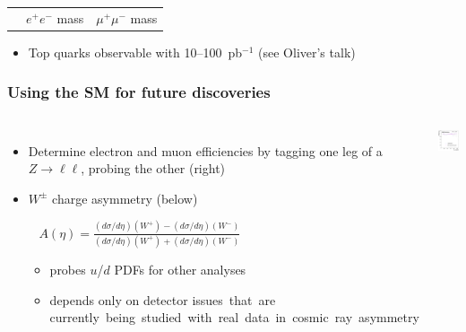 \documentclass[compress]{beamer}
\begin{document}
\begin{frame}
\begin{tabular}{c c c}
& {\scriptsize $e^+e^-$ mass} & {\scriptsize $\mu^+\mu^-$ mass} \\
\end{tabular}

\begin{itemize}
\item Top quarks observable with 10--100~pb$^{-1}$ (see Oliver's talk)
\end{itemize}
\label{rediscovering_standard_model}
\end{frame}

\begin{frame}
\frametitle{Using the SM for future discoveries}

\begin{columns}
\begin{itemize}
\item Determine electron and muon efficiencies by tagging one leg of a $Z\to\ell\ell$, probing the other (right)

\item $W^\pm$ charge asymmetry (below)

\mbox{ } \hfill {\scriptsize $\displaystyle A(\eta) = \frac{(d\sigma/d\eta)(W^+) - (d\sigma/d\eta)(W^-)}{(d\sigma/d\eta)(W^+) + (d\sigma/d\eta)(W^-)}$} \hfill \mbox{ }

\begin{itemize}
\item probes $u$/$d$ PDFs for other analyses
\item depends only on detector \mbox{issues that are\hspace{-1 cm}} \mbox{currently being studied with real data in cosmic ray asymmetry\hspace{-5 cm}}
\end{itemize}
\end{itemize}

\includegraphics[width=\linewidth]{electroneff_tag-probe.png}
\end{columns}


\end{frame}
\end{document}
